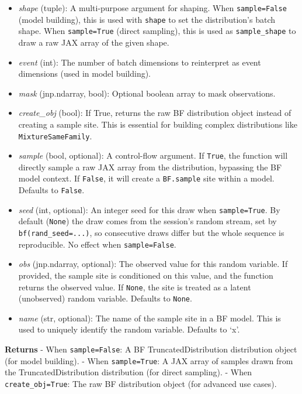 \documentclass[
  letterpaper,
  DIV=11,
  numbers=noendperiod]{scrartcl}
\begin{document}
\begin{itemize}
\item
  \emph{shape} (tuple): A multi-purpose argument for shaping. When
  \texttt{sample=False} (model building), this is used with
  \texttt{shape} to set the distribution's batch shape. When
  \texttt{sample=True} (direct sampling), this is used as
  \texttt{sample\_shape} to draw a raw JAX array of the given shape.
\item
  \emph{event} (int): The number of batch dimensions to reinterpret as
  event dimensions (used in model building).
\item
  \emph{mask} (jnp.ndarray, bool): Optional boolean array to mask
  observations.
\item
  \emph{create\_obj} (bool): If True, returns the raw BF distribution
  object instead of creating a sample site. This is essential for
  building complex distributions like \texttt{MixtureSameFamily}.
\item
  \emph{sample} (bool, optional): A control-flow argument. If
  \texttt{True}, the function will directly sample a raw JAX array from
  the distribution, bypassing the BF model context. If \texttt{False},
  it will create a \texttt{BF.sample} site within a model. Defaults to
  \texttt{False}.
\item
  \emph{seed} (int, optional): An integer seed for this draw when
  \texttt{sample=True}. By default (\texttt{None}) the draw comes from
  the session's random stream, set by \texttt{bf(rand\_seed=...)}, so
  consecutive draws differ but the whole sequence is reproducible. No
  effect when \texttt{sample=False}.
\item
  \emph{obs} (jnp.ndarray, optional): The observed value for this random
  variable. If provided, the sample site is conditioned on this value,
  and the function returns the observed value. If \texttt{None}, the
  site is treated as a latent (unobserved) random variable. Defaults to
  \texttt{None}.
\item
  \emph{name} (str, optional): The name of the sample site in a BF
  model. This is used to uniquely identify the random variable. Defaults
  to `x'.
\end{itemize}

\textbf{Returns} - When \texttt{sample=False}: A BF
TruncatedDistribution distribution object (for model building). - When
\texttt{sample=True}: A JAX array of samples drawn from the
TruncatedDistribution distribution (for direct sampling). - When
\texttt{create\_obj=True}: The raw BF distribution object (for advanced
use cases).
\end{document}
